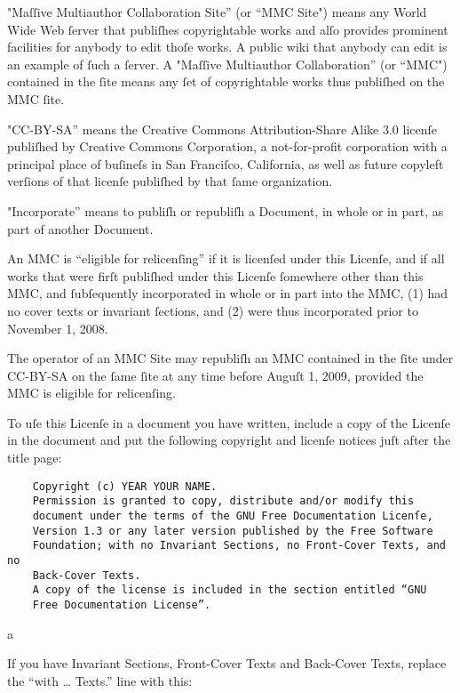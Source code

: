 
"Maſſive Multiauthor Collaboration Site” (or “MMC Site") means any World 
Wide Web ſerver that publiſhes copyrightable works and alſo provides 
prominent facilities for anybody to edit thoſe works. A public wiki that 
anybody can edit is an example of ſuch a ſerver. A "Maſſive Multiauthor 
Collaboration” (or “MMC") contained in the ſite means any ſet of 
copyrightable works thus publiſhed on the MMC ſite.

"CC-BY-SA” means the Creative Commons Attribution-Share Alike 3.0 
licenſe publiſhed by Creative Commons Corporation, a not-for-profit 
corporation with a principal place of buſineſs in San Franciſco, 
California, as well as future copyleft verſions of that licenſe 
publiſhed by that ſame organization.

"Incorporate” means to publiſh or republiſh a Document, in whole or in 
part, as part of another Document.

An MMC is “eligible for relicenſing” if it is licenſed under this 
Licenſe, and if all works that were firſt publiſhed under this Licenſe 
ſomewhere other than this MMC, and ſubſequently incorporated in whole or 
in part into the MMC, (1) had no cover texts or invariant ſections, and 
(2) were thus incorporated prior to November 1, 2008.

The operator of an MMC Site may republiſh an MMC contained in the ſite 
under CC-BY-SA on the ſame ſite at any time before Auguſt 1, 2009, 
provided the MMC is eligible for relicenſing.



To uſe this Licenſe in a document you have written, include a copy of 
the Licenſe in the document and put the following copyright and licenſe 
notices juſt after the title page:


 \begin{verbatim}
    Copyright (c) YEAR YOUR NAME.
    Permission is granted to copy, distribute and/or modify this
    document under the terms of the GNU Free Documentation Licenſe,
    Version 1.3 or any later version published by the Free Software
    Foundation; with no Invariant Sections, no Front-Cover Texts, and no
    Back-Cover Texts.
    A copy of the license is included in the section entitled “GNU
    Free Documentation License”.
 \end{verbatim}a

If you have Invariant Sections, Front-Cover Texts and Back-Cover Texts, 
replace the “with … Texts.” line with this:

